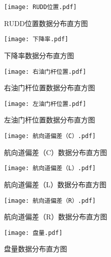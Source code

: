 \documentclass{MathorCupModeling}
\begin{document}
	\begin{figure}[H]
		\centering
		\begin{minipage}{0.48\linewidth}
			\centering
			\texttt{[image: RUDD位置.pdf]}
			\caption{RUDD位置数据分布直方图}
			\label{fig:RUDD位置}
		\end{minipage}
		\begin{minipage}{0.48\linewidth}
			\centering
			\texttt{[image: 下降率.pdf]}
			\caption{下降率数据分布直方图}
			\label{fig:下降率}
		\end{minipage}
	\end{figure}
	\begin{figure}[H]
		\centering
		\begin{minipage}{0.48\linewidth}
			\centering
			\texttt{[image: 右油门杆位置.pdf]}
			\caption{右油门杆位置数据分布直方图}
			\label{fig:右油门杆位置}
		\end{minipage}
		\begin{minipage}{0.48\linewidth}
			\centering
			\texttt{[image: 左油门杆位置.pdf]}
			\caption{左油门杆位置数据分布直方图}
			\label{fig:左油门杆位置}
		\end{minipage}
	\end{figure}
	\begin{figure}[H]
		\centering
		\begin{minipage}{0.48\linewidth}
			\centering
			\texttt{[image: 航向道偏差（C）.pdf]}
			\caption{航向道偏差（C）数据分布直方图}
			\label{fig:航向道偏差（C）}
		\end{minipage}
		\begin{minipage}{0.48\linewidth}
			\centering
			\texttt{[image: 航向道偏差（L）.pdf]}
			\caption{航向道偏差（L）数据分布直方图}
			\label{fig:航向道偏差（L）}
		\end{minipage}
	\end{figure}
	\begin{figure}[H]
		\centering
		\begin{minipage}{0.48\linewidth}
			\centering
			\texttt{[image: 航向道偏差（R）.pdf]}
			\caption{航向道偏差（R）数据分布直方图}
			\label{fig:航向道偏差（R）}
		\end{minipage}
		\begin{minipage}{0.48\linewidth}
			\centering
			\texttt{[image: 盘量.pdf]}
			\caption{盘量数据分布直方图}
			\label{fig:盘量}
		\end{minipage}
	\end{figure}
\end{document}
